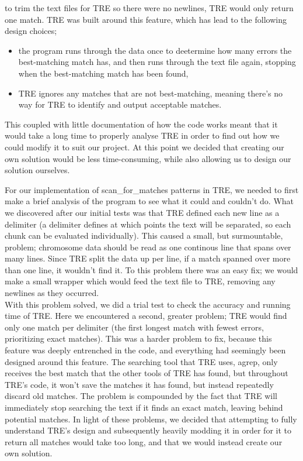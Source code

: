 to trim the text files for TRE so there were no newlines, TRE would only 
return one match. TRE was built around this feature, which has lead to the following 
design choices;
\begin{itemize}
\item the program runs through the data once to deetermine how many errors the 
best-matching match has, and then runs through the text file again, stopping 
when the best-matching match has been found, 
\item TRE ignores any matches that are not best-matching, meaning there's 
no way for TRE to identify and output acceptable matches.
\end{itemize}
This coupled with little documentation of how the code works meant that it would 
take a long time to properly analyse TRE in order to find out how we could 
modify it to suit our project. At this point we decided that creating our 
own solution would be less time-consuming, while also allowing us to design our 
solution ourselves.





  
For our implementation of scan\_for\_matches patterns in TRE, we needed to 
first make a brief analysis of the program to see what it could and couldn't 
do. What we discovered after our initial tests was that TRE defined each 
new line as a delimiter (a delimiter defines at which points the text will be 
separated, so each chunk can be evaluated individually). 
This caused a small, but surmountable, problem; chromosome data 
should be read as one continous line that spans over many lines. Since TRE 
split the data up per line, if a match spanned over more than one line, it 
wouldn't find it. To this problem there was an easy fix; we would make a small 
wrapper which would feed the text file to TRE, removing any newlines as they 
occurred.\\
With this problem solved, we did a trial test to check the accuracy and 
running time of TRE. Here we encountered a second, greater problem; TRE 
would find only one match per delimiter (the first longest match with fewest 
errors, prioritizing exact matches). This was a harder problem to fix, because this feature was 
deeply entrenched in the code, and everything had seemingly been designed 
around this feature. The searching tool that TRE uses, agrep, only receives 
the best match that the other tools of TRE has found, but throughout TRE's 
code, it won't save the matches it has found, but instead repeatedly discard old 
matches. The problem is compounded by the fact that TRE will immediately stop searching the 
text if it finds an exact match, leaving behind potential matches. In light of 
these problems, we decided that attempting to fully understand TRE's design and 
subsequently heavily modding it in order for it to return all matches would 
take too long, and that we would instead create our own solution.
